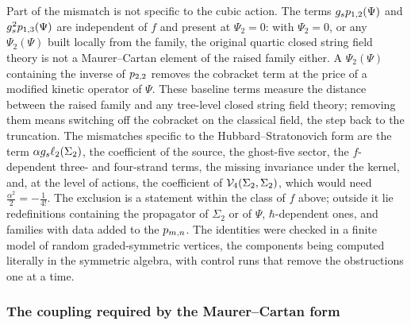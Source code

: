 Part of the mismatch is not specific to the cubic action.
The terms $g_s p_{1,2}(\Psi)$ and $g_s^2 p_{1,3}(\Psi)$ are independent of $f$ and present at $\Psi_2 = 0$: with $\Psi_2 = 0$, or any $\Psi_2(\Psi)$ built locally from the family, the original quartic closed string field theory is not a Maurer--Cartan element of the raised family either.
A $\Psi_2(\Psi)$ containing the inverse of $p_{2,2}$ removes the cobracket term at the price of a modified kinetic operator of $\Psi$.
These baseline terms measure the distance between the raised family and any tree-level closed string field theory; removing them means switching off the cobracket on the classical field, the step back to the \Loo{} truncation.
The mismatches specific to the Hubbard--Stratonovich form are the term $\alpha g_s \ell_2(\Sigma_2)$, the coefficient of the source, the ghost-five sector, the $f$-dependent three- and four-strand terms, the missing invariance under the kernel, and, at the level of actions, the coefficient of $\mathcal{V}_{4}(\Sigma_2, \Sigma_2)$, which would need $\tfrac{\alpha^2}{2} = - \tfrac{1}{4!}$.
The exclusion is a statement within the class of $f$ above; outside it lie redefinitions containing the propagator of $\Sigma_2$ or of $\Psi$, $\hbar$-dependent ones, and families with data added to the $p_{m,n}$.
The identities were checked in a finite model of random graded-symmetric vertices, the components being computed literally in the symmetric algebra, with control runs that remove the obstructions one at a time.

\subsubsection{The coupling required by the Maurer--Cartan form}

